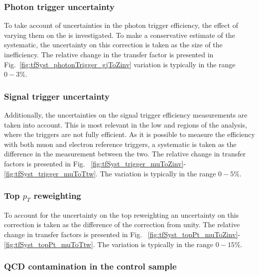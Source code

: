 %
\subsubsection*{Photon trigger uncertainty}
\label{sec:tfSyst_photonTrigger}

To take account of uncertainties in the photon trigger efficiency, the
effect of varying them on the \gj \TF is investigated. To make a
conservative estimate of the systematic, the uncertainty on this
correction is taken as the size of the inefficiency.  The relative
change in the \gj transfer factor is presented in
Fig.~\ref{fig:tfSyst_photonTrigger_gjToZinv} variation is typically in
the range $0-3\%$.

\subsubsection*{Signal trigger uncertainty}
\label{sec:tfSyst_trigger}

Additionally, the uncertainties on the signal trigger efficiency
measurements are taken into account. This is most relevant in the low
\HT and \MHT regions of the analysis, where the triggers are not fully
efficient. As it is possible to measure the efficiency with both muon
and electron reference triggers, a systematic is taken as the
difference in the measurement between the two.  The relative change in
transfer factors is presented in Fig.
~\ref{fig:tfSyst_trigger_muToZinv}-\ref{fig:tfSyst_trigger_muToTtw}.
The variation is typically in the range $0-5\%$.

\subsubsection*{Top $p_T$ reweighting}
\label{sec:tfSyst_topPt}

To account for the uncertainty on the top \pT reweighting an 
uncertainty on this correction is taken as the difference of the
correction from unity. The relative change in transfer factors is
presented in Fig.
~\ref{fig:tfSyst_topPt_muToZinv}-\ref{fig:tfSyst_topPt_muToTtw}. The
variation is typically in the range $0-15\%$.

\subsubsection*{QCD contamination in the \gj control sample}
\label{sec:tfSyst_qcdCont}

